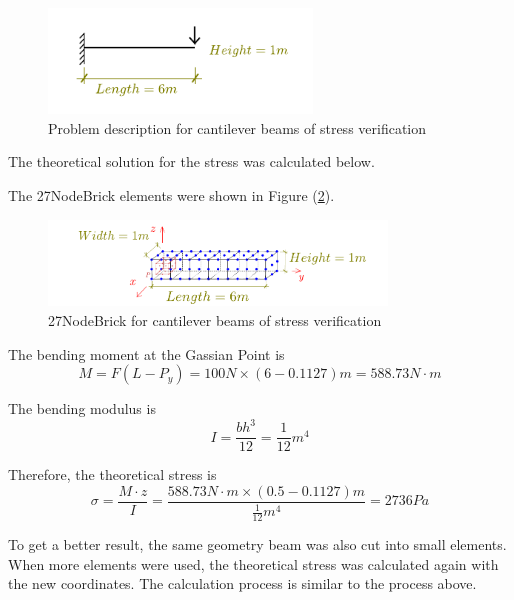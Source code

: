 \documentclass[fleqn,11pt,letter]{article}
\begin{document}
\begin{figure}[H]
  \centering
  \includegraphics[width=7cm]{../Figure_files/27NodeBrick/cantilever_6.pdf}
  \caption{Problem description for cantilever beams of stress verification}
  \label{fig Problem description for cantilever beams of stress verification 27}
\end{figure}

The theoretical solution for the stress was calculated below. 





The 27NodeBrick elements were shown in Figure (\ref{fig 27NodeBrick for cantilever beams of stress verification}).

\begin{figure}[H]
  \centering
  \includegraphics[width=9cm]{../Figure_files/27NodeBrick/beam_27brick_6div_gp.pdf}
  \caption{27NodeBrick for cantilever beams of stress verification}
  \label{fig 27NodeBrick for cantilever beams of stress verification}
\end{figure}

The bending moment at the Gassian Point is 
\begin{equation}
  M=F(L-P_y)=100 N \times (6-0.1127) m = 588.73 N\cdot m
\end{equation}

The bending modulus is 
\begin{equation}
  I= \frac{bh^3}{12}=\frac{1}{12} m^4
\end{equation}

Therefore, the theoretical stress is 
\begin{equation}
  \sigma= \frac{M\cdot z}{I}= \frac{588.73 N\cdot m \times (0.5-0.1127) m }{\frac{1}{12} m^4}= 2736 Pa
\end{equation}



To get a better result, the same geometry beam was also cut into small elements. When more elements were used, the theoretical stress was calculated again with the new coordinates. The calculation process is similar to the process above. 
\end{document}
